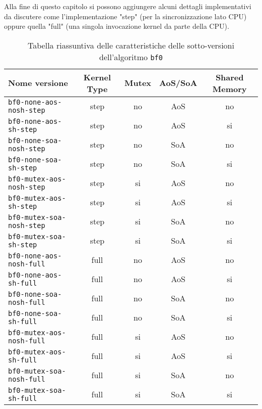 \documentclass[a4paper]{article}
\begin{document}
	Alla fine di questo capitolo si possono aggiungere alcuni dettagli implementativi da discutere come l'implementazione "step" (per la sincronizzazione lato CPU) oppure quella "full" (una singola invocazione kernel da parte della CPU).
	
	\begin{table}[!ht]
		\centering
		\begin{tabular}{|l|c|c|c|c|}
			\hline
			\textbf{Nome versione} & \textbf{Kernel Type} & \textbf{Mutex} & \textbf{AoS/SoA} & \textbf{Shared Memory} \\ \hline
			\texttt{bf0-none-aos-nosh-step}  & step & no & AoS & no \\ \hline
			\texttt{bf0-none-aos-sh-step}    & step & no & AoS & si \\ \hline
			\texttt{bf0-none-soa-nosh-step}  & step & no & SoA & no \\ \hline
			\texttt{bf0-none-soa-sh-step}    & step & no & SoA & si \\ \hline
			\texttt{bf0-mutex-aos-nosh-step} & step & si & AoS & no \\ \hline
			\texttt{bf0-mutex-aos-sh-step}   & step & si & AoS & si \\ \hline
			\texttt{bf0-mutex-soa-nosh-step} & step & si & SoA & no \\ \hline
			\texttt{bf0-mutex-soa-sh-step}   & step & si & SoA & si \\ \hline
			\texttt{bf0-none-aos-nosh-full}  & full & no & AoS & no \\ \hline
			\texttt{bf0-none-aos-sh-full}    & full & no & AoS & si \\ \hline
			\texttt{bf0-none-soa-nosh-full}  & full & no & SoA & no \\ \hline
			\texttt{bf0-none-soa-sh-full}    & full & no & SoA & si \\ \hline
			\texttt{bf0-mutex-aos-nosh-full} & full & si & AoS & no \\ \hline
			\texttt{bf0-mutex-aos-sh-full}   & full & si & AoS & si \\ \hline
			\texttt{bf0-mutex-soa-nosh-full} & full & si & SoA & no \\ \hline
			\texttt{bf0-mutex-soa-sh-full}   & full & si & SoA & si \\ \hline
		\end{tabular}
		\label{tab:riassunto_bf0}
		\caption{Tabella riassuntiva delle caratteristiche delle sotto-versioni dell'algoritmo \texttt{bf0}}
	\end{table}
	
\end{document}

